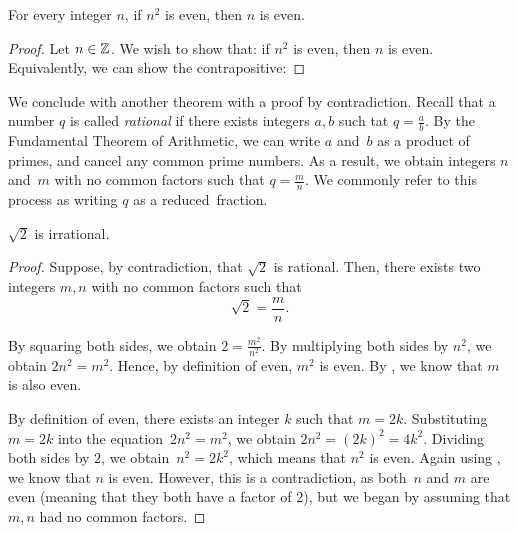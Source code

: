 \begin{theorem}\label{thm:evensquare}
    For every integer $n$, if $n^2$ is even, then $n$ is even.
\end{theorem}
\begin{proof}
    Let $n\in {\mathbb Z}$.  We wish to show that: if $n^2$ is even, then $n$ is even.
    Equivalently, we can show the contrapositive:

    \proofspace
\end{proof}

We conclude with another theorem with a proof by contradiction.  Recall that a
number $q$ is called \emph{rational} if there exists integers $a,b$ such tat
$q=\frac{a}{b}$.  By the Fundamental Theorem of Arithmetic, we can write $a$
and~$b$ as a product of primes, and cancel any common prime numbers.  As a
result, we obtain integers $n$ and~$m$ with no common factors such that
$q=\frac{m}{n}$.  We commonly refer to this process as writing $q$ as a reduced~fraction.

\begin{theorem}
    $\sqrt{2}$ is irrational.
\end{theorem}

\begin{proof}
    Suppose, by contradiction, that $\sqrt{2}$ is rational.  Then, there exists
    two integers $m,n$ with no common factors such that
    $$ \sqrt{2}=\frac{m}{n}.$$

    By squaring both sides, we obtain $2=\frac{m^2}{n^2}$.
    By multiplying both sides by $n^2$, we obtain $2n^2=m^2$.
    Hence, by definition of even, $m^2$ is even.
    By , we know that $m$ is also even.

    By definition of even, there exists an integer $k$ such that $m=2k$.
    Substituting $m=2k$ into the equation~$2n^2=m^2$, we obtain
    $2n^2=(2k)^2=4k^2$. Dividing both sides by $2$, we obtain~$n^2=2k^2$, which
    means that $n^2$ is even.  Again using , we know that $n$
    is even.  However, this is a contradiction, as both~$n$ and $m$ are even
    (meaning that they both have a factor of $2$),
    but we began by assuming that $m,n$ had no common factors.
\end{proof}

